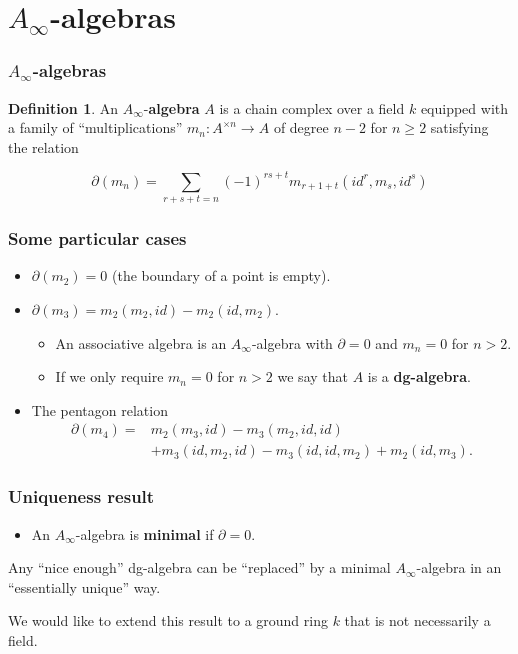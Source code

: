 \documentclass{beamer}
\theoremstyle{definition}
\newtheorem{defi}{Definition}
\begin{document}
\section{$A_\infty$-algebras}
\begin{frame}
\frametitle{$A_\infty$-algebras}
\begin{defi}
An $A_\infty$-\textbf{algebra} $A$ is a chain complex over a field $k$ equipped with a family of ``multiplications'' $m_n:A^{\times n}\to A$ of degree $n-2$ for $n\geq 2$ satisfying the relation

\[\partial(m_n)=\sum_{r+s+t=n}(-1)^{rs+t}m_{r+1+t}(id^{ r}, m_s, id^{ s})\] %
\end{defi}

\end{frame}





\begin{frame}
\frametitle{Some particular cases}

\begin{itemize}
\item<1-> $\partial(m_2)=0$ (the boundary of a point is empty).
\item<2-> $\partial(m_3)=m_2(m_2, id)-m_2(id, m_2)$.
\begin{itemize}
\item<3-> An associative algebra is an $A_\infty$-algebra with $\partial=0$ and $m_n=0$ for $n>2$.
\item<4-> If we only require $m_n=0$ for $n>2$ we say that $A$ is a \textbf{dg-algebra}. %
\end{itemize}
\item<5-> The pentagon relation \begin{align*}
\partial(m_4)=&m_2(m_3, id)-m_3(m_2, id, id)\\
&+m_3(id, m_2, id)-m_3(id, id, m_2)+m_2(id, m_3).
\end{align*}
\end{itemize}
\end{frame}

\begin{frame}
\frametitle{Uniqueness result}
\begin{itemize}
\item An $A_\infty$-algebra is \textbf{minimal} if $\partial = 0$. 
\end{itemize}\pause
\begin{theorem}[Kadeishvili]
Any ``nice enough'' dg-algebra can be ``replaced'' by a minimal $A_\infty$-algebra in an ``essentially unique'' way.
\end{theorem}\pause
We would like to extend this result to a ground ring $k$ that is not necessarily a field.
\end{frame}
\end{document}
